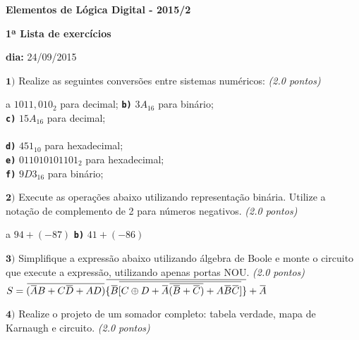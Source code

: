 \documentclass[12pt]{article}
\newcommand{\exerc}[3]{ \vspace*{25pt} {$\mathbf{#1)}$} #2 \hfill {\it #3} }
\newcommand{\exitem}[2]{ \texttt{\bf #1)} #2 \\ }
\newcommand*\xor{\mathbin{\oplus}}
\renewcommand{\neg}[1]{ 
  \mkern 1.5mu\overline{\mkern-1.5mu#1\mkern-1.5mu}\mkern 1.5mu
}
\newenvironment{exitems}[1]{
\\
\hspace*{30pt}
\begin{minipage}{0.8\textwidth}
\begin{multicols}{#1} 
}{
\end{multicols}
\end{minipage}
}
\begin{document}

\begin{center}
{\Large \bf Elementos de Lógica Digital - 2015/2}
\end{center}

{\large \bf 1ª Lista de exercícios}

{\bf dia:} 24/09/2015

\exerc{1}{Realize as seguintes conversões entre sistemas numéricos:}{(2.0 pontos)}
\begin{exitems}{2}
	\exitem{a}{ $1011,010_2$ para decimal;}
	\exitem{b}{ $3A_{16}$ para binário;}
	\exitem{c}{ $15A_{16}$ para decimal;}
	\\
	\exitem{d}{ $451_{10}$ para hexadecimal;}
	\exitem{e}{ $0110 1010 1101_{2}$ para hexadecimal;}
	\exitem{f}{ $9D3_{16}$ para binário;}
\end{exitems}

\exerc{2}{Execute as operações abaixo utilizando representação binária. Utilize a notação de complemento de 2 para números negativos.}{(2.0 pontos)}
\begin{exitems}{2}
	\exitem{a}{ $94 + (-87)$}
	\exitem{b}{ $41 + (-86)$}
\end{exitems}

\exerc{3}{Simplifique a expressão abaixo utilizando álgebra de Boole e monte o circuito que execute a expressão, utilizando apenas portas NOU.}{(2.0 pontos)}
$S = \neg{(\neg{A}B + C\neg{D} + AD)}\neg{\{\neg{B}\neg{[C\xor D + \neg{A}\neg{(\neg{B} + \neg{C})} + A\neg{B}\neg{C}]}\}}+\neg{A}$

\exerc{4}{Realize o projeto de um somador completo: tabela verdade, mapa de Karnaugh e circuito.}{(2.0 pontos)}
\end{document}
